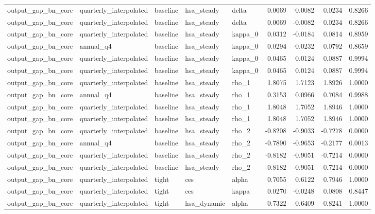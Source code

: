 \begin{tabular}{lllllrrrr}
output\_gap\_bn\_core & quarterly\_interpolated & baseline & hsa\_steady & delta & 0.0069 & -0.0082 & 0.0234 & 0.8266 \\
output\_gap\_bn\_core & quarterly\_interpolated & baseline & hsa\_steady & delta & 0.0069 & -0.0082 & 0.0234 & 0.8266 \\
output\_gap\_bn\_core & quarterly\_interpolated & baseline & hsa\_steady & kappa\_0 & 0.0312 & -0.0184 & 0.0814 & 0.8959 \\
output\_gap\_bn\_core & annual\_q4 & baseline & hsa\_steady & kappa\_0 & 0.0294 & -0.0232 & 0.0792 & 0.8659 \\
output\_gap\_bn\_core & quarterly\_interpolated & baseline & hsa\_steady & kappa\_0 & 0.0465 & 0.0124 & 0.0887 & 0.9994 \\
output\_gap\_bn\_core & quarterly\_interpolated & baseline & hsa\_steady & kappa\_0 & 0.0465 & 0.0124 & 0.0887 & 0.9994 \\
output\_gap\_bn\_core & quarterly\_interpolated & baseline & hsa\_steady & rho\_1 & 1.8075 & 1.7123 & 1.8926 & 1.0000 \\
output\_gap\_bn\_core & annual\_q4 & baseline & hsa\_steady & rho\_1 & 0.3153 & 0.0966 & 0.7084 & 0.9988 \\
output\_gap\_bn\_core & quarterly\_interpolated & baseline & hsa\_steady & rho\_1 & 1.8048 & 1.7052 & 1.8946 & 1.0000 \\
output\_gap\_bn\_core & quarterly\_interpolated & baseline & hsa\_steady & rho\_1 & 1.8048 & 1.7052 & 1.8946 & 1.0000 \\
output\_gap\_bn\_core & quarterly\_interpolated & baseline & hsa\_steady & rho\_2 & -0.8208 & -0.9033 & -0.7278 & 0.0000 \\
output\_gap\_bn\_core & annual\_q4 & baseline & hsa\_steady & rho\_2 & -0.7890 & -0.9653 & -0.2177 & 0.0013 \\
output\_gap\_bn\_core & quarterly\_interpolated & baseline & hsa\_steady & rho\_2 & -0.8182 & -0.9051 & -0.7214 & 0.0000 \\
output\_gap\_bn\_core & quarterly\_interpolated & baseline & hsa\_steady & rho\_2 & -0.8182 & -0.9051 & -0.7214 & 0.0000 \\
output\_gap\_bn\_core & quarterly\_interpolated & tight & ces & alpha & 0.7055 & 0.6122 & 0.7946 & 1.0000 \\
output\_gap\_bn\_core & quarterly\_interpolated & tight & ces & kappa & 0.0270 & -0.0248 & 0.0808 & 0.8447 \\
output\_gap\_bn\_core & quarterly\_interpolated & tight & hsa\_dynamic & alpha & 0.7322 & 0.6409 & 0.8241 & 1.0000 \\

\end{tabular}
